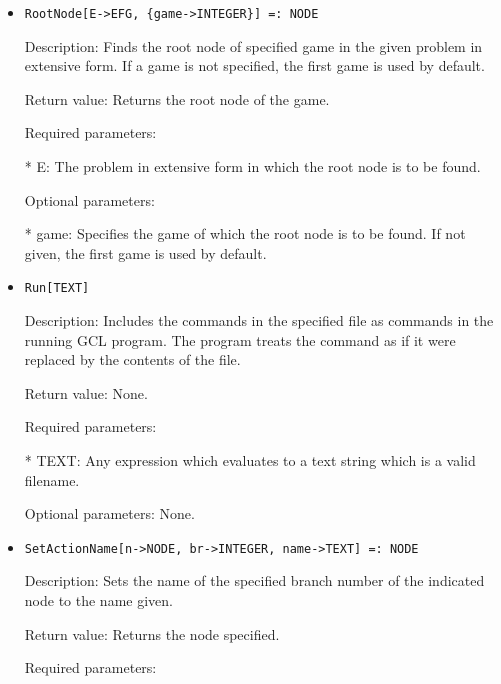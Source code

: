 \begin{itemize}
\item
\begin{verbatim}
RootNode[E->EFG, {game->INTEGER}] =: NODE
\end{verbatim}

\bd
\item
[Description:] Finds the root node of specified game in the given 
problem in extensive form.  If a game is not specified, the first game 
is used by default.
\item
[Return value:] Returns the root node of the game.
\item
[Required parameters:]\hfil\null
	
\bd
\item
[* E:] The problem in extensive form in which the root node is to be
found.
\ed

\item
[Optional parameters:]\hfil\null

\bd
\item
[* game:] Specifies the game of which the root node is to be found.
If not given, the first game is used by default.
\ed
\ed

\item

\begin{verbatim}
Run[TEXT]
\end{verbatim}

\bd
\item
[Description:] Includes the commands in the specified file as commands 
in the running GCL program.  The program treats the command as if it 
were replaced by the contents of the file.
\item
[Return value:] None.
\item
[Required parameters:]\hfil\null
	
\bd
\item
[* TEXT:] Any expression which evaluates to a text string which is a
valid filename.
\ed

\item
[Optional parameters:] None.
\ed

\item

\begin{verbatim}
SetActionName[n->NODE, br->INTEGER, name->TEXT] =: NODE
\end{verbatim}

\bd
\item
[Description:] Sets the name of the specified branch number of the 
indicated node to the name given.
\item
[Return value:] Returns the node specified.
\item
[Required parameters:]\hfil\null
	

\end{itemize}
